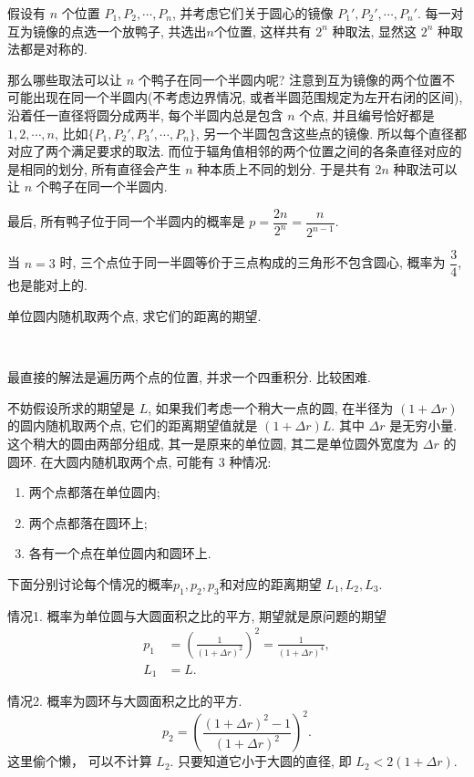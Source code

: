 假设有 $n$ 个位置 $P_1, P_2, \cdots, P_n$, 并考虑它们关于圆心的镜像 $P_1', P_2', \cdots, P_n'$. 每一对互为镜像的点选一个放鸭子, 共选出$n$个位置, 这样共有 $2^n$ 种取法, 显然这 $2^n$ 种取法都是对称的. 

那么哪些取法可以让 $n$ 个鸭子在同一个半圆内呢? 注意到互为镜像的两个位置不可能出现在同一个半圆内(不考虑边界情况, 或者半圆范围规定为左开右闭的区间), 沿着任一直径将圆分成两半, 每个半圆内总是包含 $n$ 个点, 并且编号恰好都是 $1,2,\cdots,n$, 比如$\{P_1, P_2', P_3',\cdots,P_n\}$, 另一个半圆包含这些点的镜像. 所以每个直径都对应了两个满足要求的取法. 而位于辐角值相邻的两个位置之间的各条直径对应的是相同的划分, 所有直径会产生 $n$ 种本质上不同的划分. 于是共有 $2n$ 种取法可以让 $n$ 个鸭子在同一个半圆内.

最后, 所有鸭子位于同一个半圆内的概率是 $p=\dfrac{2n}{2^n} = \dfrac{n}{2^{n-1}}$.

当 $n=3$ 时, 三个点位于同一半圆等价于三点构成的三角形不包含圆心, 概率为 $\dfrac{3}{4}$, 也是能对上的.


\newpage

单位圆内随机取两个点, 求它们的距离的期望.

~

最直接的解法是遍历两个点的位置, 并求一个四重积分. 比较困难.

不妨假设所求的期望是 $L$, 如果我们考虑一个稍大一点的圆, 在半径为 $(1+\Delta r)$ 的圆内随机取两个点, 它们的距离期望值就是 $(1+\Delta r)L$. 其中 $\Delta r$ 是无穷小量. 这个稍大的圆由两部分组成, 其一是原来的单位圆, 其二是单位圆外宽度为 $\Delta r$ 的圆环. 
在大圆内随机取两个点, 可能有 $3$ 种情况: 
\begin{enumerate}
\item 两个点都落在单位圆内;
\item 两个点都落在圆环上;
\item 各有一个点在单位圆内和圆环上.
\end{enumerate}
下面分别讨论每个情况的概率$p_1, p_2, p_3$和对应的距离期望 $L_1, L_2, L_3$.

情况1. 概率为单位圆与大圆面积之比的平方, 期望就是原问题的期望
\begin{align*} 
p_1 &= \left( \frac{1}{(1+\Delta r)^2} \right)^2 = \frac{1}{(1+\Delta r)^4},\\
L_1 &= L.
\end{align*} 

情况2. 概率为圆环与大圆面积之比的平方.
\[p_2 = \left( \frac{(1+\Delta r)^2 - 1}{(1+\Delta r)^2} \right)^2 .\]
这里偷个懒， 可以不计算 $L_2$. 只要知道它小于大圆的直径, 即 $L_2 < 2(1+\Delta r)$.

